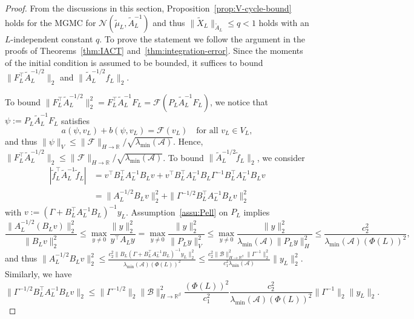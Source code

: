 \documentclass[11pt,english]{article}
\theoremstyle{plain}
\theoremstyle{plain}
\theoremstyle{plain}
\theoremstyle{plain}
\numberwithin{equation}{section}
\begin{document}
\begin{proof}From the discussions in this section, Proposition~\ref{prop:V-cycle-bound}
	holds for the MGMC for $\mathcal{N}(\widetilde{\mu}_{L},\widetilde{A}_{L}^{-1})$
	and thus $\|\tilde{X}_{L}\|_{\tilde{A}_{L}}\leq q<1$ holds with an
	$L$-independent constant $q$. To prove the statement we follow the
	argument in the proofs of Theorems~\ref{thm:IACT} and~\ref{thm:integration-error}.
	Since the moments of the initial condition is assumed to be bounded,
	it suffices to bound $\|F_{L}^\top\widetilde{A}_{L}^{-1/2}\|_{2}$ and
	$\|\widetilde{A}_{L}^{-1/2}f_{L}\|_{2}$.

	To bound $\|F_{L}^\top \widetilde{A}_{L}^{-1/2}\|_{2}^{2}=F_{L}^\top\widetilde{A}_{L}^{-1}F_{L}=\mathcal{F}(P_{L}\widetilde{A}_{L}^{-1}F_{L})$,
	we notice that $\psi:=P_{L}\widetilde{A}_{L}^{-1}F_{L}$ satisfies
	\[
		a(\psi,v_{L})+b(\psi,v_{L})=\mathcal{F}(v_{L})\quad\text{for all }v_{L}\in V_{L},
	\]
	and thus $\|\psi\|_{V}\leq\|\mathcal{F}\|_{H\to\mathbb{R}}/\sqrt{\lambda_{\mathrm{min}}(\mathcal{A})}$.
	Hence, $\|F_{L}^\top\widetilde{A}_{L}^{-1/2}\|_{2}\leq\|\mathcal{F}\|_{H\to\mathbb{R}}/\sqrt{\lambda_{\mathrm{min}}(\mathcal{A})}$.
	To bound $\|\widetilde{A}_{L}^{-1/2}\widetilde{f}_{L}\|_{2}$,
	we consider
	\begin{align*}
		|\widetilde{f}_{L}^{\top}\widetilde{A}_{L}^{-1}\widetilde{f}_{L}| & =v^{\top}B_{L}^{\top}A_{L}^{-1}B_{L}v+v^{\top}B_{L}^{\top}A_{L}^{-1}B_{L}\Gamma^{-1}B_{L}^{\top}A_{L}^{-1}B_{L}v \\
		                                                                                    & =\|A_{L}^{-1/2}B_{L}v\|_{2}^{2}+\|\Gamma^{-1/2}B_{L}^{\top}A_{L}^{-1}B_{L}v\|_{2}^{2}
	\end{align*}
	with $v:=(\Gamma+B_{L}^{\top}A_{L}^{-1}B_{L})^{-1}y_{L}$.
	Assumption~\ref{assu:Pell} on $P_{L}$ implies
	\[
		\frac{\|A_{L}^{-1/2}(B_{L}v)\|_{2}^{2}}{\|B_{L}v\|_{2}^{2}}\leq\max_{y\neq0}\frac{\|y\|_{2}^{2}}{y^{\top}A_{L}y}=\max_{y\neq0}\frac{\|y\|_{2}^{2}}{\|P_{L}y\|_{V}^{2}}\leq\max_{y\neq0}\frac{\|y\|_{2}^{2}}{\lambda_{\mathrm{min}}(\mathcal{A})\|P_{L}y\|_{H}^{2}}\leq\frac{c_{2}^{2}}{\lambda_{\mathrm{min}}(\mathcal{A})(\Phi(L))^{2}},
	\]
	and thus
	$\|A_{L}^{-1/2}B_{L}v\|_{2}^{2}
		\leq
		\frac{c_{2}^{2}\|B_{L}(\Gamma+B_{L}^{\top}A_{L}^{-1}B_{L})^{-1}y_{L}\|_{2}^{2}}{\lambda_{\mathrm{min}}(\mathcal{A})(\Phi(L))^{2}}
		\leq
		\frac{c_{2}^{2}\|\mathcal{B}\|_{H\to\mathbb{R}^{\beta}}^{2}\|\Gamma^{-1}\|_{2}^{2}}{c_{1}^{2}\lambda_{\mathrm{min}}(\mathcal{A})}\|y_{L}\|_{2}^{2}$.
	Similarly, we have
	\[
		\|\Gamma^{-1/2}B_{L}^{\top}A_{L}^{-1}B_{L}v\|_{2}\leq\|\Gamma^{-1/2}\|_{2}\|\mathcal{B}\|_{H\to\mathbb{R}^{\beta}}^{2}\frac{(\Phi(L))^{2}}{c_{1}^{2}}\frac{c_{2}^{2}}{\lambda_{\mathrm{min}}(\mathcal{A})(\Phi(L))^{2}}\|\Gamma^{-1}\|_{2}\|y_{L}\|_{2}.
	\]


\end{proof}
\end{document}
